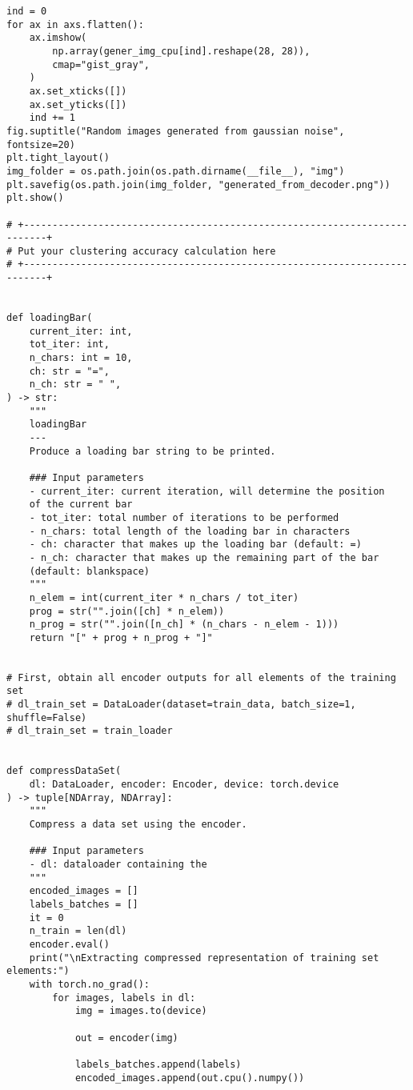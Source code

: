 \documentclass[12pt]{article}
\begin{document}
\begin{verbatim}
ind = 0
for ax in axs.flatten():
    ax.imshow(
        np.array(gener_img_cpu[ind].reshape(28, 28)),
        cmap="gist_gray",
    )
    ax.set_xticks([])
    ax.set_yticks([])
    ind += 1
fig.suptitle("Random images generated from gaussian noise", fontsize=20)
plt.tight_layout()
img_folder = os.path.join(os.path.dirname(__file__), "img")
plt.savefig(os.path.join(img_folder, "generated_from_decoder.png"))
plt.show()

# +--------------------------------------------------------------------------+
# Put your clustering accuracy calculation here
# +--------------------------------------------------------------------------+


def loadingBar(
    current_iter: int,
    tot_iter: int,
    n_chars: int = 10,
    ch: str = "=",
    n_ch: str = " ",
) -> str:
    """
    loadingBar
    ---
    Produce a loading bar string to be printed.

    ### Input parameters
    - current_iter: current iteration, will determine the position
    of the current bar
    - tot_iter: total number of iterations to be performed
    - n_chars: total length of the loading bar in characters
    - ch: character that makes up the loading bar (default: =)
    - n_ch: character that makes up the remaining part of the bar
    (default: blankspace)
    """
    n_elem = int(current_iter * n_chars / tot_iter)
    prog = str("".join([ch] * n_elem))
    n_prog = str("".join([n_ch] * (n_chars - n_elem - 1)))
    return "[" + prog + n_prog + "]"


# First, obtain all encoder outputs for all elements of the training set
# dl_train_set = DataLoader(dataset=train_data, batch_size=1, shuffle=False)
# dl_train_set = train_loader


def compressDataSet(
    dl: DataLoader, encoder: Encoder, device: torch.device
) -> tuple[NDArray, NDArray]:
    """
    Compress a data set using the encoder.

    ### Input parameters
    - dl: dataloader containing the
    """
    encoded_images = []
    labels_batches = []
    it = 0
    n_train = len(dl)
    encoder.eval()
    print("\nExtracting compressed representation of training set elements:")
    with torch.no_grad():
        for images, labels in dl:
            img = images.to(device)

            out = encoder(img)

            labels_batches.append(labels)
            encoded_images.append(out.cpu().numpy())


\end{verbatim}
\end{document}
